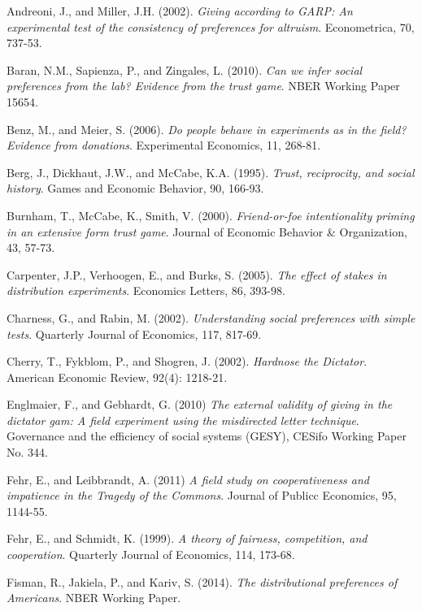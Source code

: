 \documentclass{article}
\begin{document}
{\begin{thebibliography}{9}
Andreoni, J., and Miller, J.H. (2002).
\textit{Giving according to GARP: An experimental test of the consistency of preferences for altruism}.
Econometrica, 70, 737-53.

Baran, N.M., Sapienza, P., and Zingales, L. (2010).
\textit{Can we infer social preferences from the lab? Evidence from the trust game}.
NBER Working Paper 15654.

Benz, M., and Meier, S. (2006).
\textit{Do people behave in experiments as in the field? Evidence from donations}.
Experimental Economics, 11, 268-81.

Berg, J., Dickhaut, J.W., and McCabe, K.A. (1995).
\textit{Trust, reciprocity, and social history}.
Games and Economic Behavior, 90, 166-93.

Burnham, T., McCabe, K., Smith, V. (2000).
\textit{Friend-or-foe intentionality priming in an extensive form trust game}.
Journal of Economic Behavior \& Organization, 43, 57-73.

Carpenter, J.P., Verhoogen, E., and Burks, S. (2005).
\textit{The effect of stakes in distribution experiments}.
Economics Letters, 86, 393-98.

Charness, G., and Rabin, M. (2002).
\textit{Understanding social preferences with simple tests}.
Quarterly Journal of Economics, 117, 817-69.

Cherry, T., Fykblom, P., and Shogren, J. (2002).
\textit{Hardnose the Dictator}.
American Economic Review, 92(4): 1218-21.

Englmaier, F., and Gebhardt, G. (2010)
\textit{The external validity of giving in the dictator gam: A field experiment using the misdirected letter technique}.
Governance and the efficiency of social systems (GESY), CESifo Working Paper No. 344.

Fehr, E., and Leibbrandt, A. (2011)
\textit{A field study on cooperativeness and impatience in the Tragedy of the Commons}.
Journal of Publicc Economics, 95, 1144-55.

Fehr, E., and Schmidt, K. (1999).
\textit{A theory of fairness, competition, and cooperation}.
Quarterly Journal of Economics, 114, 173-68.

Fisman, R., Jakiela, P., and Kariv, S. (2014).
\textit{The distributional preferences of Americans}.
NBER Working Paper.


\end{thebibliography}}
\end{document}
